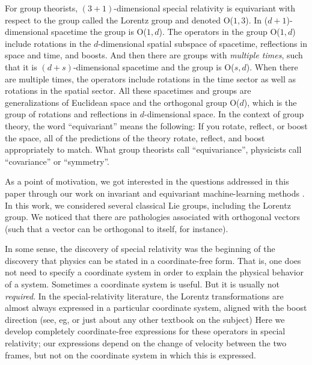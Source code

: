 \documentclass{article}
\newcommand{\plus}{\!+\!} %
\begin{document}
For group theorists, $(3\plus1)$-dimensional special relativity is equivariant with respect to the group called the Lorentz group and denoted O($1,3$).
In ($d\plus1$)-dimensional spacetime the group is O($1,d$).
The operators in the group O($1,d$) include rotations in the $d$-dimensional spatial subspace of spacetime, reflections in space and time, and boosts. %
And then there are groups with \emph{multiple times}, such that it is $(d\plus s)$-dimensional spacetime and the group is O($s,d$).
When there are multiple times, the operators include rotations in the time sector as well as rotations in the spatial sector.
All these spacetimes and groups are generalizations of Euclidean space and the orthogonal group O($d$), which is the group of rotations and reflections in $d$-dimensional space.
In the context of group theory, the word ``equivariant'' means the following:
If you rotate, reflect, or boost the space, all of the predictions of the theory rotate, reflect, and boost appropriately to match.
What group theorists call ``equivariance'', physicists call ``covariance'' or ``symmetry''.

As a point of motivation, we got interested in the questions addressed in this paper through our work on invariant and equivariant machine-learning methods \cite{scalars}.
In this work, we considered several classical Lie groups, including the Lorentz group.
We noticed that there are pathologies associated with orthogonal vectors (such that a vector can be orthogonal to itself, for instance).

In some sense, the discovery of special relativity was the beginning of the discovery that physics can be stated in a coordinate-free form.
That is, one does not need to specify a coordinate system in order to explain the physical behavior of a system.
Sometimes a coordinate system is useful.
But it is usually not \emph{required}.
In the special-relativity literature, the Lorentz transformations are almost always expressed in a particular coordinate system, aligned with the boost direction (see, eg, \cite{french, zakamska} or just about any other textbook on the subject)
Here we develop completely coordinate-free expressions for these operators in special relativity; our expressions depend on the change of velocity between the two frames, but not on the coordinate system in which this is expressed.
\end{document}
